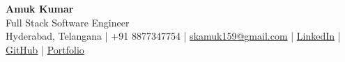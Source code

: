 \begin{center}
    {\Huge \textbf{Amuk Kumar}} \\[4pt]
    {\small Full Stack Software Engineer} \\[6pt]
    {\footnotesize
    Hyderabad, Telangana \;|\;
    +91 8877347754 \;|\;
    \href{mailto:skamuk159@gmail.com}{skamuk159@gmail.com} \;|\;
    \href{https://www.linkedin.com/in/amukkumar}{LinkedIn} \;|\;
    \href{https://github.com/amukkumar}{GitHub} \;|\;
    \href{https://amukkumar.com}{Portfolio}
    }
\end{center}